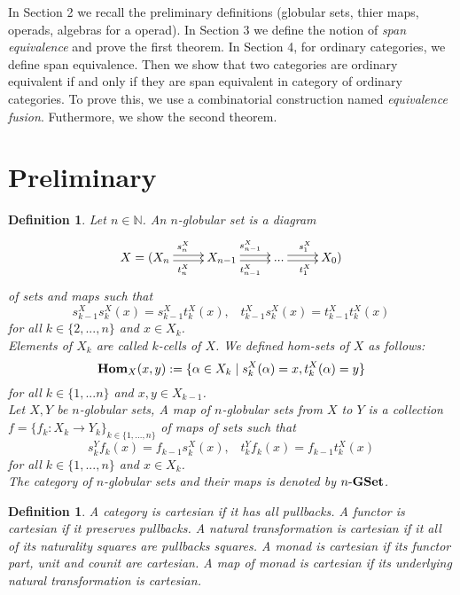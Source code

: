 \documentclass[12pt]{article}
\theoremstyle{plain}
\newtheorem{definition}[theorem]{Definition}
\theoremstyle{definition}
\begin{document}
In Section 2 we recall the preliminary definitions (globular sets, thier maps, operads, algebras for a operad). In Section 3 we define the notion of \emph{span equivalence} and prove the first theorem. In Section 4, for ordinary categories, we define span equivalence. Then we show that two categories are ordinary equivalent if and only if they are span equivalent in category of ordinary categories. To prove this, we use a combinatorial construction named \emph{equivalence fusion}. Futhermore, we show the second theorem.

\section{Preliminary}

\begin{definition}
Let $n \in \mathbb{N}$. An {\em$n$-globular set} is a diagram 
\[
\xymatrix{
X = ( X_n \ar@<0.5ex>[r]^{s_n^X} \ar@<-0.5ex>[r]_{t_n^X} & X_{n-1} \ar@<0.5ex>[r]^{s_{n-1}^X} \ar@<-0.5ex>[r]_{t_{n-1}^X} 
 & ... \ar@<0.5ex>[r]^{s_1^X} \ar@<-0.5ex>[r]_{t_1^X} & X_{0}  )
 }
\]
of sets and maps such that
\[
s_{k-1}^X s_{k}^X (x) =s_{k-1}^X t_{k}^X (x) , \hspace{10pt} t_{k-1}^X s_{k}^X (x) = t_{k-1}^X t_{k}^X (x)
\]
for all $k \in \{ 2,...,n \} $ and $x \in X_k$. \\
Elements of $X_k$ are called {\em$k$-cells} of $X$. We defined {\em hom-sets} of $X$ as follows:
\[
{\bf Hom}_{X}(x,y) := \{ \alpha \in X_k \mid s_k^X(\alpha)=x, t_k^X(\alpha)=y \}
\] 
for all $k \in \{ 1,...n \} $ and $x,y \in X_{k-1}$.\\
Let $X,Y$ be $n$-globular sets, A \emph{map} of $n$-globular sets from $X$ to $Y$ is a collection $f=\{ f_{k}: X_{k} \rightarrow Y_{k} \}_{k \in \{ 1,...,n \}}$ of maps of sets such that 
\[
s_k^Y f_k (x) = f_{k-1} s_{k}^X (x) , \hspace{10pt} t_{k}^Y f_k (x) = f_{k-1} t_{k}^X (x)
\]
for all $k \in \{ 1,...,n \} $ and $x \in X_{k}$. \\
The category of $n$-globular sets and their maps is denoted by $n \mathchar`- {\bf GSet}$.
\end{definition}

\begin{definition}
A category is {\em cartesian} if it has all pullbacks. A functor is {\em cartesian} if it preserves pullbacks. A natural transformation is {\em cartesian} if it all of its naturality squares are pullbacks squares. A monad is {\em cartesian} if its functor part, unit and counit are cartesian. A map of monad is {\em cartesian} if its underlying natural transformation is cartesian.
\end{definition}
\end{document}

